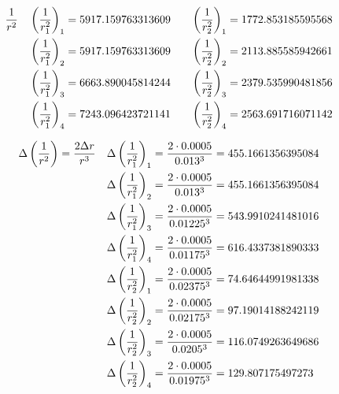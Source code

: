 \documentclass[12pt,a4paper]{article}
\def\AdditiveConstant    {\fpeval{1.7 * 10^(-2)}} %
\def\rOneThreePointFivekV{\fpeval{((0.5 + 1.3) / 2 * 10^(-2) + \AdditiveConstant) / 2}} %
\def\rTwoThreePointFivekV{\fpeval{((2.6 + 3.5) / 2 * 10^(-2) + \AdditiveConstant) / 2}} %
\def\rOneFourPointZerokV {\fpeval{((0.6 + 1.2) / 2 * 10^(-2) + \AdditiveConstant) / 2}} %
\def\rTwoFourPointZerokV {\fpeval{((2.3 + 3.0) / 2 * 10^(-2) + \AdditiveConstant) / 2}} %
\def\rOneFourPointFivekV {\fpeval{((0.5 + 1.0) / 2 * 10^(-2) + \AdditiveConstant) / 2}} %
\def\rTwoFourPointFivekV {\fpeval{((2.0 + 2.8) / 2 * 10^(-2) + \AdditiveConstant) / 2}} %
\def\rOneFivePointZerokV {\fpeval{((0.4 + 0.9) / 2 * 10^(-2) + \AdditiveConstant) / 2}} %
\def\rTwoFivePointZerokV {\fpeval{((2.0 + 2.5) / 2 * 10^(-2) + \AdditiveConstant) / 2}} %
\begin{document}
\begin{equation*}
    \begin{aligned}
        \frac{1}{r^2} \quad & \left(\frac{1}{r_1^2}\right)_1 = \YOneThreePointFivekV \quad & \left(\frac{1}{r_2^2}\right)_1 = \YTwoThreePointFivekV \\
        & \left(\frac{1}{r_1^2}\right)_2 = \YOneFourPointZerokV \quad & \left(\frac{1}{r_2^2}\right)_2 = \YTwoFourPointZerokV \\
        & \left(\frac{1}{r_1^2}\right)_3 = \YOneFourPointFivekV \quad & \left(\frac{1}{r_2^2}\right)_3 = \YTwoFourPointFivekV \\
        & \left(\frac{1}{r_1^2}\right)_4 = \YOneFivePointZerokV \quad & \left(\frac{1}{r_2^2}\right)_4 = \YTwoFivePointZerokV
    \end{aligned}
\end{equation*}

\begin{equation*}
    \begin{aligned}
        \Delta\left(\frac{1}{r^2}\right) = \frac{2 \Delta r}{r^3} 
        \quad & \Delta\left(\frac{1}{r_1^2}\right)_1 = \frac{2 \cdot \DeltaR}{\rOneThreePointFivekV^3} = \DeltaYOneThreePointFivekV \\
        & \Delta\left(\frac{1}{r_1^2}\right)_2 = \frac{2 \cdot \DeltaR}{\rOneFourPointZerokV^3} = \DeltaYOneFourPointZerokV \\
        & \Delta\left(\frac{1}{r_1^2}\right)_3 = \frac{2 \cdot \DeltaR}{\rOneFourPointFivekV^3} = \DeltaYOneFourPointFivekV \\
        & \Delta\left(\frac{1}{r_1^2}\right)_4 = \frac{2 \cdot \DeltaR}{\rOneFivePointZerokV^3} = \DeltaYOneFivePointZerokV \\
        & \Delta\left(\frac{1}{r_2^2}\right)_1 = \frac{2 \cdot \DeltaR}{\rTwoThreePointFivekV^3} = \DeltaYTwoThreePointFivekV \\
        & \Delta\left(\frac{1}{r_2^2}\right)_2 = \frac{2 \cdot \DeltaR}{\rTwoFourPointZerokV^3} = \DeltaYTwoFourPointZerokV \\
        & \Delta\left(\frac{1}{r_2^2}\right)_3 = \frac{2 \cdot \DeltaR}{\rTwoFourPointFivekV^3} = \DeltaYTwoFourPointFivekV \\
        & \Delta\left(\frac{1}{r_2^2}\right)_4 = \frac{2 \cdot \DeltaR}{\rTwoFivePointZerokV^3} = \DeltaYTwoFivePointZerokV
    \end{aligned}
\end{equation*}
\end{document}

